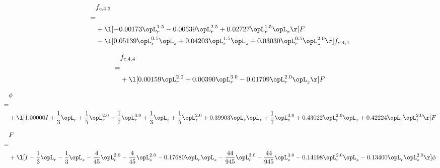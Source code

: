 \begin{alignat}{2} 
\label{eq:f_43_2} 
& f_{c,4,3} \nonumber \\ 
 = \\ 
& + \l[  -0.00173 \opL_r^{1.5}   -0.00539 \opL_r^{2.5} +  0.02727 \opL_r^{1.5} \opL_z  \r] F \nonumber \\ 
& - \l[  0.05139 \opL_r^{0.5} \opL_z +  0.04203 \opL_r^{1.5} \opL_z +  0.03030 \opL_r^{0.5} \opL_z^{2.0}  \r] f_{c,4,4} \nonumber \\ 
\end{alignat} 


\begin{alignat}{2} 
\label{eq:f_44_2} 
& f_{c,4,4} \nonumber \\ 
 = \\ 
& + \l[  0.00159 \opL_r^{2.0} +  0.00390 \opL_r^{3.0}   -0.01709 \opL_r^{2.0} \opL_z  \r] F \nonumber \\ 
\end{alignat} 


\begin{alignat}{2} 
\label{eq:scalarFlux_1} 
& \phi \nonumber \\ 
 = \\ 
& + \l[  1.00000 I + \frac{1}{3} \opL_r + \frac{1}{5} \opL_r^{2.0} + \frac{1}{7} \opL_r^{3.0} + \frac{1}{3} \opL_z + \frac{1}{5} \opL_z^{2.0} +  0.39903 \opL_r \opL_z + \frac{1}{7} \opL_z^{3.0} +  0.43022 \opL_r^{2.0} \opL_z +  0.42224 \opL_r \opL_z^{2.0}  \r] F \nonumber \\ 
\end{alignat} 


\begin{alignat}{2} 
\label{eq:transport3D_0} 
& F \nonumber \\ 
 = \\ 
& + \l[ I - \frac{1}{3} \opL_r - \frac{1}{3} \opL_z - \frac{4}{45} \opL_r^{2.0} - \frac{4}{45} \opL_z^{2.0}   -0.17680 \opL_r \opL_z - \frac{44}{945} \opL_r^{3.0} - \frac{44}{945} \opL_z^{3.0}   -0.14198 \opL_r^{2.0} \opL_z   -0.13400 \opL_r \opL_z^{2.0}  \r] \phi \nonumber \\ 
\end{alignat} 


